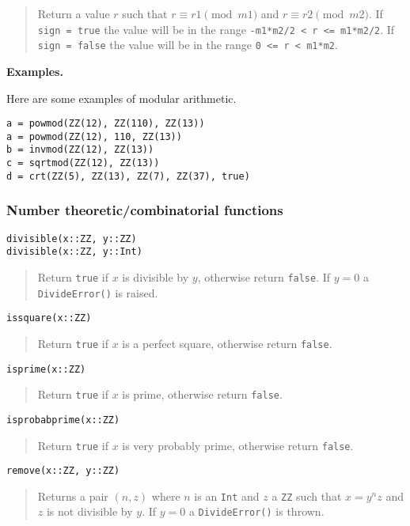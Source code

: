 \documentclass[a4paper,10pt]{article}
\newcommand{\code}{\lstinline}
\newcommand{\desc}[1]{\vspace{-3mm}\begin{quote}#1\end{quote}}
\begin{document}
{{{\desc{Return a value $r$ such that $r \equiv r1 \pmod {m1}$ and $r \equiv r2 \pmod{m2}$.
If \code{sign = true} the value will be in the range \code{-m1*m2/2 < r <= m1*m2/2}. If
\code{sign = false} the value will be in the range \code{0 <= r < m1*m2}.}

\textbf{Examples.}

Here are some examples of modular arithmetic.

\begin{lstlisting}
a = powmod(ZZ(12), ZZ(110), ZZ(13))
a = powmod(ZZ(12), 110, ZZ(13))
b = invmod(ZZ(12), ZZ(13))
c = sqrtmod(ZZ(12), ZZ(13))
d = crt(ZZ(5), ZZ(13), ZZ(7), ZZ(37), true)
\end{lstlisting}

\subsubsection{Number theoretic/combinatorial functions}

\begin{lstlisting}
divisible(x::ZZ, y::ZZ)
divisible(x::ZZ, y::Int)
\end{lstlisting}

\desc{Return \code{true} if $x$ is divisible by $y$, otherwise return \code{false}. If
$y = 0$ a \code{DivideError()} is raised.}

\begin{lstlisting}
issquare(x::ZZ)
\end{lstlisting}

\desc{Return \code{true} if $x$ is a perfect square, otherwise return \code{false}.}

\begin{lstlisting}
isprime(x::ZZ)
\end{lstlisting}

\desc{Return \code{true} if $x$ is prime, otherwise return \code{false}.}

\begin{lstlisting}
isprobabprime(x::ZZ)
\end{lstlisting}

\desc{Return \code{true} if $x$ is very probably prime, otherwise return \code{false}.}

\begin{lstlisting}
remove(x::ZZ, y::ZZ)
\end{lstlisting}

\desc{Returns a pair $(n, z)$ where $n$ is an \code{Int} and $z$ a \code{ZZ} such that
$x = y^nz$ and $z$ is not divisible by $y$. If $y = 0$ a \code{DivideError()} is thrown.}

}}}
\end{document}
